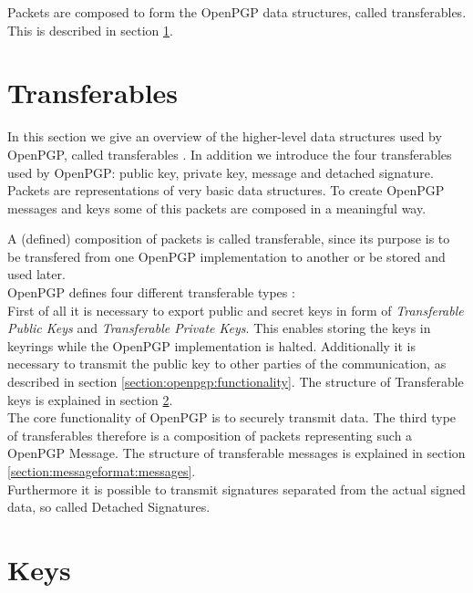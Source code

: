Packets are composed to form the OpenPGP data structures, called transferables. This is described in section \ref{section:messageformat:transferables}. \\

\section{Transferables}
\label{section:messageformat:transferables}

In this section we give an overview of the higher-level data structures used by OpenPGP, called transferables \cite[section 11]{RFC4880}. In addition we introduce the four transferables used by OpenPGP: public key, private key, message and detached signature.  \\

Packets are representations of very basic data structures. To create OpenPGP messages and keys some of this packets are composed in a meaningful way.

A (defined) composition of packets is called transferable, since its purpose is to be transfered from one OpenPGP implementation to another or be stored and used later. \\

OpenPGP defines four different transferable types \cite[section 11]{RFC4880}: \\

First of all it is necessary to export public and secret keys in form of \textit{Transferable Public Keys} and \textit{Transferable Private Keys}. This enables storing the keys in keyrings while the OpenPGP implementation is halted. Additionally it is necessary to transmit the public key to other parties of the communication, as described in section \ref{section:openpgp:functionality}. The structure of Transferable keys is explained in section \ref{section:messageformat:keys}.  \\

The core functionality of OpenPGP is to securely transmit data. The third type of transferables therefore is a composition of packets representing such a OpenPGP Message. The structure of transferable messages is explained in section \ref{section:messageformat:messages}. \\

Furthermore it is possible to transmit signatures separated from the actual signed data, so called Detached Signatures.

\section{Keys}
\label{section:messageformat:keys}

